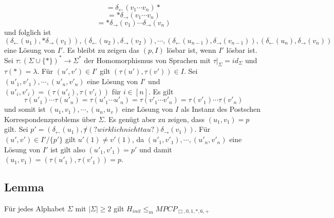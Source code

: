  \[= \delta_{\leftarrow}(v_1 \cdots v_n)*\] \[= *\delta_{\rightarrow}(v_1 \cdots v_n)\] \[=*\delta_{\rightarrow}(v_1) \cdots \delta_{\rightarrow}(v_n)\] und folglich ist \[(\delta_{\leftarrow}(u_1), *\delta_{\rightarrow}(v_1)), (\delta_{\leftarrow}(u_2), \delta_{\rightarrow}(v_2)), \cdots, (\delta_{\leftarrow}(u_{n-1}), \delta_{\rightarrow}(v_{n-1})), (\delta_{\leftarrow}(u_{n}), \delta_{\rightarrow}(v_{n}))\] eine Lösung von $I'$. Es bleibt zu zeigen das $(p, I)$ lösbar ist, wenn $I'$ lösbar ist. Sei $\tau : (\Sigma \cup \{*\})^* \rightarrow \Sigma^*$ der Homomorphismus von Sprachen mit $\tau \vert_{\Sigma} = id_{\Sigma}$ und $\tau(*) = \lambda$. Für $(u', v') \in I'$ gilt $(\tau (u'), \tau(v')) \in I$. Sei $(u'_1, v'_1), \cdots, (u'_n, v'_n)$ eine Lösung von $I'$ und $(u'_i, v'_i) = (\tau(u'_i), \tau(v'_i))$ für $i \in [n]$. Es gilt \[\tau(u'_1) \cdots \tau(u'_n) = \tau(u'_1 \cdots u'_n) = \tau(v'_1 \cdots v'_n) = \tau(v'_1) \cdots \tau(v'_n)\] und somit ist $(u_1, v_1), \cdots, (u_n, u_v)$ eine Lösung von $I$ als Instanz des Postschen Korrespondenzproblems über $\Sigma$. Es genügt aber zu zeigen, dass $(u_1, v_1) = p $ gilt. Sei $p' = (\delta_{\leftarrow} (u_1), \not \tau (?wirklich nicht tau?) \delta_{\rightarrow}(v_1))$. Für $(u', v') \in I' / \{p'\}$ gilt $u'(1) \not = v'(1)$, da $(u'_1, v'_1), \cdots, (u'_n, v'_n)$ eine Lösung von $I'$ ist gilt also $(u'_1, v'_1) = p'$ und damit $(u_1, v_1) = (\tau(u'_1), \tau(v'_1)) = p$.

  \subsection{Lemma} Für jedes Alphabet $\Sigma$ mit $|\Sigma| \geq 2$ gilt $H_{init} \leq_m MPCP_{\Box, 0, 1, *, 6, +}$

